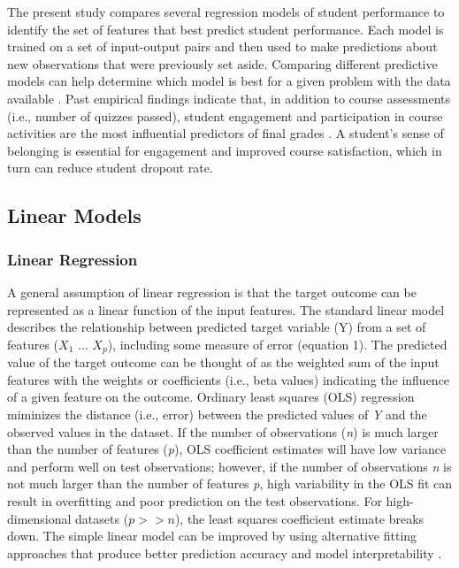 \documentclass[sigconf]{acmart}
\begin{document}

The present study compares several regression models of student performance 
to identify the set of features that best predict student performance. Each 
model is trained on a set of input-output pairs and then used to make 
predictions about new observations that were previously set aside. Comparing 
different predictive models can help determine which model is best for a given 
problem with the data available \cite{raschka17}. Past empirical findings 
indicate that, in addition to course assessments (i.e., number of quizzes 
passed), student engagement and participation in course activities are the most 
influential predictors of final grades \cite{papamitsiou14, romero10}. 
A student's sense of belonging is essential for engagement and improved course 
satisfaction, which in turn can reduce student dropout rate. 

\subsection{Linear Models} 

\subsubsection{Linear Regression} 
A general assumption of linear regression is that the target outcome can be 
represented as a linear function of the input features. The standard linear 
model describes the relationship between predicted target variable 
(Y) from a set of features ($X_1$ ... $X_p$), including some measure of error 
(equation 1). The predicted value of the target outcome can be thought of as 
the weighted sum of the input features with the weights or coefficients 
(i.e., beta values) indicating the influence of a given feature on the outcome.
Ordinary least squares (OLS) regression miminizes the distance (i.e., error) 
between the predicted values of \textit{Y} and the observed values in the 
dataset. If the number of observations (\textit{n}) is much larger than the 
number of features (\textit{p}), OLS coefficient estimates will have low 
variance and perform well on test observations; however, if the number of 
observations \textit{n} is not much larger than the number of features 
\textit{p}, high variability in the OLS fit can result in overfitting and 
poor prediction on the test observations. For high-dimensional datasets 
(\textit{$p>>n$}), the least squares coefficient estimate breaks down. The 
simple linear model can be improved by using alternative fitting approaches 
that produce better prediction accuracy and model interpretability 
\cite{jamesetal13}. 
\end{document}

